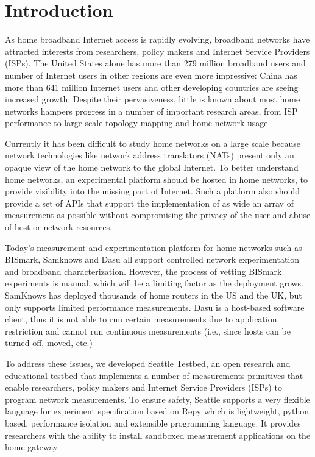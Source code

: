 \section{Introduction}
\label{sec.introduction}
As home broadband Internet access is rapidly evolving, broadband networks 
have attracted interests from researchers, policy makers and Internet 
Service Providers (ISPs). The United States alone has more than 279 million 
broadband users and number of Internet users in other regions are even more 
impressive: China has more than 641 million Internet users and other 
developing countries are seeing increased growth. Despite their 
pervasiveness, little is known about most home networks hampers progress in 
a number of important research areas, from ISP performance to large-scale 
topology mapping and home network usage.

Currently it has been difficult to study home networks on a large scale 
because network technologies like network address translators (NATs) present 
only an opaque view of the home network to the global Internet. To better 
understand home networks, an experimental platform should be hosted in home 
networks, to provide visibility into the missing part of Internet. Such a 
platform also should provide a set of APIs that support the implementation 
of as wide an array of measurement as possible without compromising the 
privacy of the user and abuse of host or network resources. 

Today's measurement and experimentation platform for home networks such as 
BISmark, Samknows and Dasu all support controlled network experimentation 
and broadband characterization. However, the process of vetting BISmark 
experiments is manual, which will be a limiting factor as the deployment 
grows. SamKnows has deployed thousands of home routers in the US and the UK, 
but only supports limited performance measurements. Dasu is a host-based 
software client, thus it is not able to run certain measurements due to 
application restriction and cannot run continuous measurements (i.e., since 
hosts can be turned off, moved, etc.)
 
To address these issues, we developed Seattle Testbed, an open research and 
educational testbed that implements a number of measurements primitives that 
enable researchers, policy makers and Internet Service Providers (ISPs) to 
program network measurements. To ensure safety, Seattle supports a very 
flexible language for experiment specification based on Repy which is 
lightweight, python based, performance isolation and extensible programming 
language. It provides researchers with the ability to install sandboxed 
measurement applications on the home gateway. 


